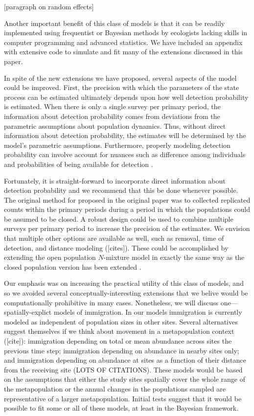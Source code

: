 \documentclass[12pt]{article}
\begin{document}
[paragraph on random effects]

Another important benefit of this class of models is that it can be
readily implemented using frequentist or Bayesian methods by
ecologists lacking skills in computer programming and advanced
statistics. We have included an appendix with extensive code to
simulate and fit many of the extensions discussed in this paper.

In spite of the new extensions we have proposed, several aspects of
the model could be improved. First, the precision with which the
parameters of the state process can be estimated ultimately depends
upon how well detection probability is estimated. When there is only a
single survey per primary period, the information about detection
probability comes from deviations from the parametric assumptions
about population dynamics. Thus, without direct information about
detection probability, the estimates will be determined by the model's
parametric assumptions. Furthermore, properly modeling detection
probability can involve account for nuances such as difference among
individuals and probabilities of being available for detection
\citep{nichols_etal:2009}.

Fortunately, it is straight-forward to incorporate direct information about
detection probability and we recommend that this be done whenever
possible. The original method for proposed in the original paper was
to collected replicated counts within the primary periods during a
period in which the populations could be assumed to be closed.  A
robust design could be used to combine multiple surveys per primary
period to increase the precision of the estimates. We envision that
multiple other options are available as well, such as removal, time of
detection, and distance modeling ([cites]). These could be
accomplished by extending the open population $N$-mixture model in
exactly the same way as the closed population version has been
extended \citep[e.g.,][]{royle_etal:2004}.

Our emphasis was on increasing the practical utility of this class of
models, and so we avoided several conceptually-interesting extensions
that we belive would be computationally prohibitive in many
cases. Nonetheless, we will discuss one---spatially-explict models of
immigration.
In our models immigration is currently modeled as independent of
population sizes in other sites. Several alternatives suggest
themselves if we think about movement in a metapopulation
context ([cite]): immigration depending on total or mean
abundance across sites the previous time step; immigration
depending on abundance in nearby sites only; and immigration
depending on abundance at sites as a function of their distance
from the receiving site (LOTS OF CITATIONS). These models would
be based on the assumptions that either the study sites
spatially cover the whole range of the metapopulation or the
annual changes in the populations sampled are representative of
a larger metapopulation. Initial tests suggest that it would be
possible to fit some or all of these models, at least in the
Bayesian framework.
\end{document}
